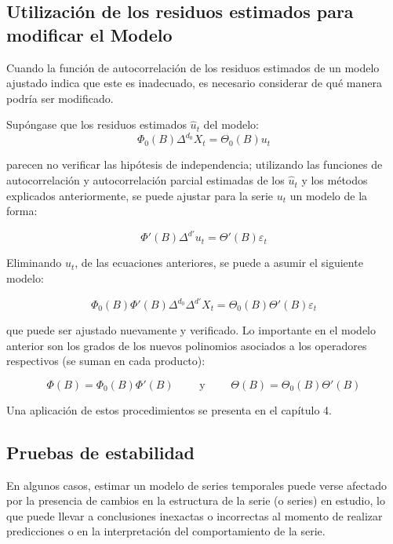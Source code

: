 \subsection{Utilizaci\'{o}n de los residuos estimados para modificar el Modelo}

Cuando la funci\'{o}n de autocorrelaci\'{o}n de los residuos estimados de un modelo ajustado indica que este es inadecuado, es necesario considerar de qu\'{e} manera podr\'{i}a ser modificado. 

Sup\'{o}ngase que los residuos estimados $\widehat{u}_{t}$ del modelo:
\[
{\Phi }_{0}\left( B \right){\Delta }^{d_{0}}X_{t}={\Theta }_{0}(B)u_{t}
\]

parecen no verificar las hip\'{o}tesis de independencia; utilizando las funciones de autocorrelaci\'{o}n y autocorrelaci\'{o}n parcial estimadas de los $\widehat{u}_{t}$ y los m\'{e}todos explicados anteriormente, se puede ajustar para la serie $u_{t}$ un modelo de la forma:

\[
{\Phi }'\left( B \right){\Delta }^{d'}u_{t}={\Theta }'(B)\varepsilon_{t}
\]

Eliminando $u_{t}$, de las ecuaciones anteriores, se puede a asumir el siguiente modelo:

\[
{\Phi }_{0}\left( B \right){\Phi }'\left( B \right){\Delta }^{d_{0}}{\Delta}^{d'}X_{t}={\Theta }_{0}(B){\Theta }'(B)\varepsilon_{t}
\]

que puede ser ajustado nuevamente y verificado. Lo importante en el modelo anterior son los grados de los nuevos polinomios asociados a los operadores respectivos (se suman en cada producto):

\[
{\Phi }\left( {B} \right){=}{\Phi }_{0}\left( B \right){\Phi }'\left( B \right) \qquad \text{ y }\qquad {\Theta }\left( {B} \right){=}{\Theta }_{0}(B){\Theta }'(B)
\]

Una aplicaci\'{o}n de estos procedimientos se presenta en el cap\'{i}tulo 4.

\subsection{Pruebas de estabilidad}

En algunos casos, estimar un modelo de series temporales puede verse afectado por la presencia de cambios en la estructura de la serie (o series) en estudio, lo que puede llevar a conclusiones inexactas o incorrectas al momento de realizar predicciones o en la interpretaci\'{o}n del comportamiento de la serie.\newline

